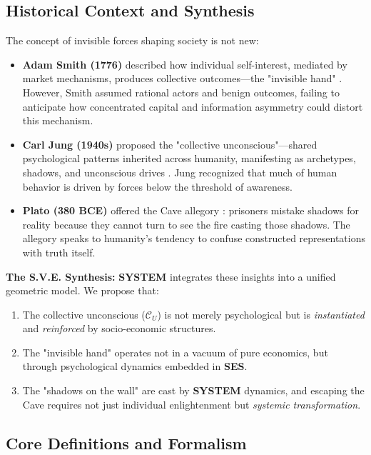 \documentclass[11pt,a4paper]{article}
\newcommand{\SYSTEM}{\textbf{SYSTEM}}
\newcommand{\SES}{\textbf{SES}}
\newcommand{\CU}{$\mathcal{C}_U$}
\theoremstyle{definition}
\theoremstyle{remark}
\begin{document}
\subsection{Historical Context and Synthesis}

The concept of invisible forces shaping society is not new:

\begin{itemize}[leftmargin=*]
\item \textbf{Adam Smith (1776)} described how individual self-interest, mediated by market mechanisms, produces collective outcomes—the "invisible hand" \cite{smith1776wealth}. However, Smith assumed rational actors and benign outcomes, failing to anticipate how concentrated capital and information asymmetry could distort this mechanism.

\item \textbf{Carl Jung (1940s)} proposed the "collective unconscious"—shared psychological patterns inherited across humanity, manifesting as archetypes, shadows, and unconscious drives \cite{jung_collective_unconscious}. Jung recognized that much of human behavior is driven by forces below the threshold of awareness.

\item \textbf{Plato (380 BCE)} offered the Cave allegory \cite{plato_republic}: prisoners mistake shadows for reality because they cannot turn to see the fire casting those shadows. The allegory speaks to humanity's tendency to confuse constructed representations with truth itself.
\end{itemize}

\textbf{The S.V.E. Synthesis:} \SYSTEM{} integrates these insights into a unified geometric model. We propose that:

\begin{enumerate}
\item The collective unconscious (\CU{}) is not merely psychological but is \textit{instantiated} and \textit{reinforced} by socio-economic structures.
\item The "invisible hand" operates not in a vacuum of pure economics, but through psychological dynamics embedded in \SES{}.
\item The "shadows on the wall" are cast by \SYSTEM{} dynamics, and escaping the Cave requires not just individual enlightenment but \textit{systemic transformation}.
\end{enumerate}

\subsection{Core Definitions and Formalism}
\end{document}
